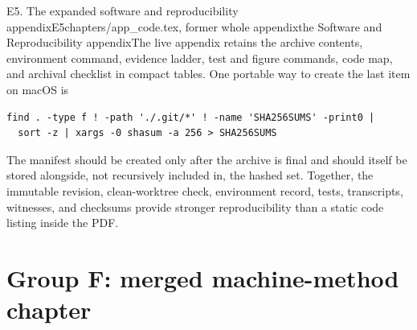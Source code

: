 \begin{offcut}{E5. The expanded software and reproducibility appendix}{E5}{chapters/app\_code.tex, former whole appendix}{the Software and Reproducibility appendix}{The live appendix retains the archive contents, environment command, evidence ladder, test and figure commands, code map, and archival checklist in compact tables.}
One portable way to create the last item on macOS is

\begin{verbatim}
find . -type f ! -path './.git/*' ! -name 'SHA256SUMS' -print0 |
  sort -z | xargs -0 shasum -a 256 > SHA256SUMS
\end{verbatim}
The manifest should be created only after the archive is final and should itself be stored alongside, not recursively included in, the hashed set. Together, the immutable revision, clean-worktree check, environment record, tests, transcripts, witnesses, and checksums provide stronger reproducibility than a static code listing inside the PDF.
\end{offcut}

\section*{Group F: merged machine-method chapter}

